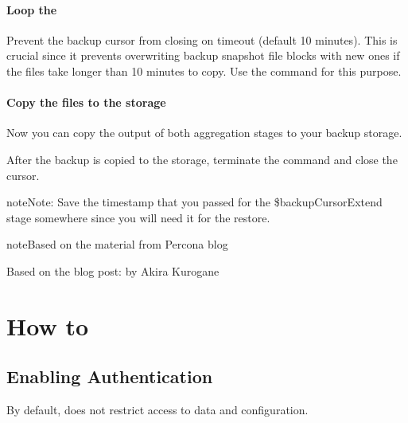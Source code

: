 \documentclass[letterpaper,10pt,english]{sphinxmanual}
\begin{document}
\subsection{Loop the }
\label{\detokenize{backup-cursor:loop-the-backupcursor}}
\sphinxAtStartPar
Prevent the backup cursor from closing on timeout (default \textendash{} 10 minutes). This is crucial since it prevents overwriting backup snapshot file blocks with new ones if the files take longer than 10 minutes to copy.  Use the  command for this purpose.


\subsection{Copy the files to the storage}
\label{\detokenize{backup-cursor:copy-the-files-to-the-storage}}
\sphinxAtStartPar
Now you can copy the output of both aggregation stages to your backup storage.

\sphinxAtStartPar
After the backup is copied to the storage, terminate the  command and close the cursor.

\begin{sphinxadmonition}{note}{Note:}
\sphinxAtStartPar
Save the timestamp that you passed for the \$backupCursorExtend stage somewhere since you will need it for the restore.
\end{sphinxadmonition}

\begin{sphinxadmonition}{note}{Based on the material from Percona blog}

\sphinxAtStartPar
Based on the blog post:  by Akira Kurogane
\end{sphinxadmonition}


\part{How to}
\label{\detokenize{index:how-to}}

\chapter{Enabling Authentication}
\label{\detokenize{enable-auth:enabling-authentication}}\label{\detokenize{enable-auth:enable-auth}}\label{\detokenize{enable-auth::doc}}
\sphinxAtStartPar
By default,  does not restrict access to data and configuration.
\end{document}
